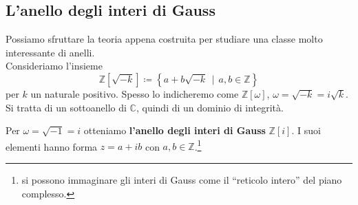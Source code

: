 \subsection{L'anello degli interi di Gauss}
\label{lezione5}
Possiamo sfruttare la teoria appena costruita per studiare una classe molto interessante di anelli. \\
Consideriamo l'insieme
\begin{equation*}
\mathbb{Z}[\sqrt{-k}]\coloneqq \left\{a+b\sqrt{-k} \, \mid \, a,b\in\mathbb{Z}\right\}
\end{equation*}
per $k$ un naturale positivo. Spesso lo indicheremo come $\mathbb{Z}[\omega]$, $\omega = \sqrt{-k}=i\sqrt{k}$. \\ Si tratta di un sottoanello di $\mathbb{C}$, quindi di un dominio di integrità.
\begin{definizione} 
	Per $\omega=\sqrt{-1}=i$ otteniamo \textbf{l'anello degli interi di Gauss} $\mathbb{Z}[i]$. I suoi elementi hanno forma $z=a+ib$ con $a,b\in\mathbb{Z}$.\footnote{si possono immaginare gli interi di Gauss come il \enquote{reticolo intero} del piano complesso.}
\end{definizione}
